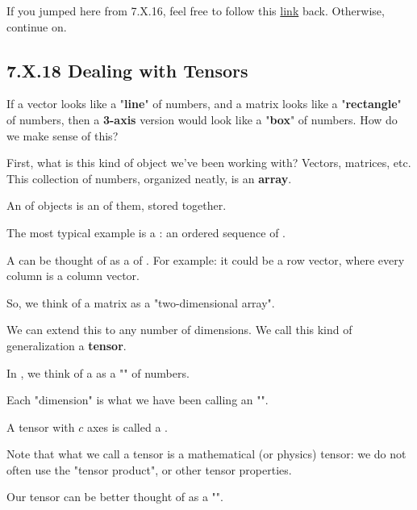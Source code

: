         If you jumped here from 7.X.16, feel free to follow this \hyperref[7.X.16]{link} back. Otherwise, continue on.
    
    \secdiv
    
    \subsection*{7.X.18 \quad Dealing with Tensors}
    
        If a vector looks like a "\textbf{line}" of numbers, and a matrix looks like a "\textbf{rectangle}" of numbers, then a \textbf{3-axis} version would look like a "\textbf{box}" of numbers. How do we make sense of this?
        
        First, what is this kind of object we've been working with? Vectors, matrices, etc. This collection of numbers, organized neatly, is an \textbf{array}.\\
        
        \begin{definition}
            An  of objects is an  of them, stored together. 
            
            The most typical example is a : an ordered sequence of .
            
            A  can be thought of as a  of . For example: it could be a row vector, where every column is a column vector. 
            
            So, we think of a matrix as a "two-dimensional array". 
        \end{definition}
        
        We can extend this to any number of dimensions. We call this kind of generalization a \textbf{tensor}.\\
        
        \begin{definition}
            In , we think of a  as a "" of numbers.
            
            Each "dimension" is what we have been calling an "".
            
            A tensor with $c$ axes is called a .
            
            Note that what we call a tensor is  a mathematical (or physics) tensor: we do not often use the "tensor product", or other tensor properties. 
            
            Our tensor can be better thought of as a "".
        \end{definition}
        

